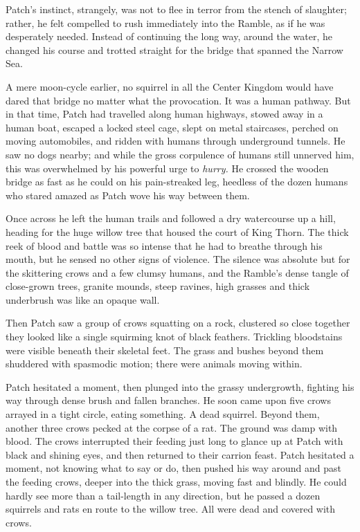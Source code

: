 \documentclass[12pt]{book}
\begin{document}
 Patch's instinct, strangely, was not to flee in terror from the stench of slaughter; rather, he felt compelled to rush immediately into the Ramble, as if he was desperately needed. Instead of continuing the long way, around the water, he changed his course and trotted straight for the bridge that spanned the Narrow Sea.\par
 A mere moon-cycle earlier, no squirrel in all the Center Kingdom would have dared that bridge no matter what the provocation. It was a human pathway. But in that time, Patch had travelled along human highways, stowed away in a human boat, escaped a locked steel cage, slept on metal staircases, perched on moving automobiles, and ridden with humans through underground tunnels. He saw no dogs nearby; and while the gross corpulence of humans still unnerved him, this was overwhelmed by his powerful urge to {\it hurry.} He crossed the wooden bridge as fast as he could on his pain-streaked leg, heedless of the dozen humans who stared amazed as Patch wove his way between them.\par
 Once across he left the human trails and followed a dry watercourse up a hill, heading for the huge willow tree that housed the court of King Thorn. The thick reek of blood and battle was so intense that he had to breathe through his mouth, but he sensed no other signs of violence. The silence was absolute but for the skittering crows and a few clumsy humans, and the Ramble's dense tangle of close-grown trees, granite mounds, steep ravines, high grasses and thick underbrush was like an opaque wall.\par
 Then Patch saw a group of crows squatting on a rock, clustered so close together they looked like a single squirming knot of black feathers. Trickling bloodstains were visible beneath their skeletal feet. The grass and bushes beyond them shuddered with spasmodic motion; there were animals moving within.\par
 Patch hesitated a moment, then plunged into the grassy undergrowth, fighting his way through dense brush and fallen branches. He soon came upon five crows arrayed in a tight circle, eating something. A dead squirrel. Beyond them, another three crows pecked at the corpse of a rat. The ground was damp with blood. The crows interrupted their feeding just long to glance up at Patch with black and shining eyes, and then returned to their carrion feast. Patch hesitated a moment, not knowing what to say or do, then pushed his way around and past the feeding crows, deeper into the thick grass, moving fast and blindly. He could hardly see more than a tail-length in any direction, but he passed a dozen squirrels and rats en route to the willow tree. All were dead and covered with crows.\par
\end{document}
